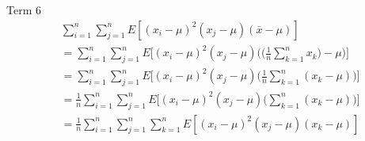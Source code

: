\documentclass[12pt,a4paper]{report}
\begin{document}
Term 6
\begin{align}
& \sum_{i = 1}^{n} \sum_{j = 1}^{n} E[(x_i - \mu)^2 (x_j - \mu) (\bar{x} - \mu)] \\
&=\sum_{i = 1}^{n} \sum_{j = 1}^{n} E \Bigg[(x_i - \mu)^2 (x_j - \mu) \Bigg( \Bigg( \frac{1}{n} \sum_{k=1}^n x_k \Bigg) - \mu \Bigg) \Bigg] \\
&=\sum_{i = 1}^{n} \sum_{j = 1}^{n} E \Bigg[(x_i - \mu)^2 (x_j - \mu) \Bigg( \frac{1}{n} \sum_{k=1}^n (x_k - \mu) \Bigg) \Bigg] \\
&=\frac{1}{n} \sum_{i = 1}^{n} \sum_{j = 1}^{n} E \Bigg[(x_i - \mu)^2 (x_j - \mu) \Bigg( \sum_{k=1}^n (x_k - \mu) \Bigg) \Bigg] \\
&=\frac{1}{n} \sum_{i = 1}^{n} \sum_{j = 1}^{n} \sum_{k=1}^n E[(x_i - \mu)^2 (x_j - \mu) (x_k - \mu) ] \label{proof_variance_term6}
\end{align}
\end{document}
